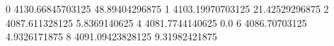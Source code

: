 0 4130.66845703125 48.89404296875
1 4103.19970703125 21.42529296875
2 4087.611328125 5.8369140625
4 4081.7744140625 0.0
6 4086.70703125 4.9326171875
8 4091.09423828125 9.31982421875

